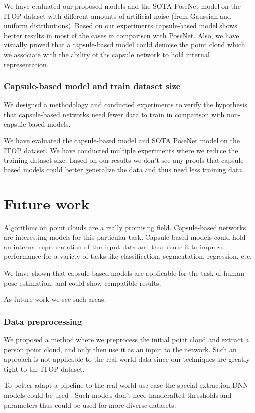 We have evaluated our proposed models and the SOTA PoseNet model on the ITOP dataset with different amounts of artificial noise (from Gaussian and uniform distributions). Based on our experiments capsule-based model shows better results in most of the cases in comparison with PoseNet. Also, we have visually proved that a capsule-based model could denoise the point cloud which we associate with the ability of the capsule network to hold internal representation.

\subsubsection{Capsule-based model and train dataset size}
We designed a methodology and conducted experiments to verify the hypothesis that capsule-based networks need fewer data to train in comparison with non-capsule-based models.

We have evaluated the capsule-based model and SOTA PoseNet model on the ITOP dataset. We have conducted multiple experiments where we reduce the training dataset size. Based on our results we don't see any proofs that capsule-based models could better generalize the data and thus need less training data.

\section{Future work}
Algorithms on point clouds are a really promising field. Capsule-based networks are interesting models for this particular task. Capsule-based models could hold an internal representation of the input data and thus reuse it to improve performance for a variety of tasks like classification, segmentation, regression, etc.

We have shown that capsule-based models are applicable for the task of human pose estimation, and could show compatible results.

As future work we see such areas:

\subsubsection{Data preprocessing}
We proposed a method where we preprocess the initial point cloud and extract a person point cloud, and only then use it as an input to the network. Such an approach is not applicable to the real-world data since our techniques are greatly tight to the ITOP dataset.

To better adapt a pipeline to the real-world use case the special extraction DNN models could be used \parencite{shi_points_2020,yang_pixor_2019}. Such models don't need handcrafted thresholds and parameters thus could be used for more diverse datasets.

